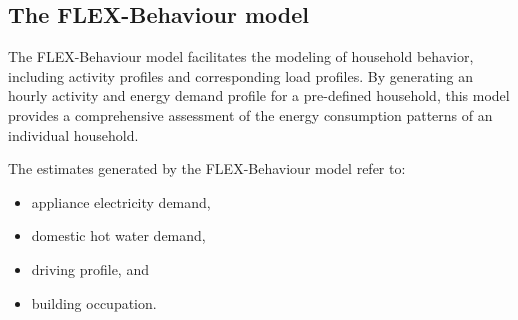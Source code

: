 


\subsection{The FLEX-Behaviour model}

The FLEX-Behaviour model \cite{newtrends} facilitates the modeling of household behavior, including activity profiles and corresponding load profiles. 
By generating an hourly activity and energy demand profile for a pre-defined household, this model provides a comprehensive assessment of the energy consumption patterns of an individual household.

The estimates generated by the FLEX-Behaviour model refer to: 
\begin{itemize}
  \item appliance electricity demand,
  \item domestic hot water demand,
  \item driving profile, and
  \item building occupation.
\end{itemize}




